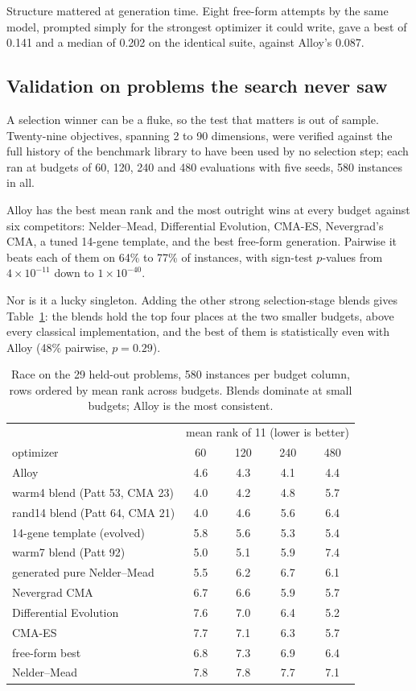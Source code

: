 \documentclass[11pt]{article}
\begin{document}
Structure mattered at generation time. Eight free-form attempts by the same
model, prompted simply for the strongest optimizer it could write, gave a
best of 0.141 and a median of 0.202 on the identical suite, against Alloy's
0.087.

\subsection{Validation on problems the search never saw}
\label{sec:heldout}

A selection winner can be a fluke, so the test that matters is out of
sample. Twenty-nine objectives, spanning 2 to 90 dimensions, were verified
against the full history of the benchmark library to have been used by no
selection step; each ran at budgets of 60, 120, 240 and 480 evaluations
with five seeds, 580 instances in all.

Alloy has the best mean rank and the most outright wins at every budget
against six competitors: Nelder--Mead, Differential Evolution, CMA-ES,
Nevergrad's CMA, a tuned 14-gene template, and the best free-form
generation. Pairwise it beats each of them on 64\% to 77\% of instances,
with sign-test $p$-values from $4\times10^{-11}$ down to
$1\times10^{-40}$.

Nor is it a lucky singleton. Adding the other strong selection-stage blends
gives Table~\ref{tab:untouched}: the blends hold the top four places at the
two smaller budgets, above every classical implementation, and the best of
them is statistically even with Alloy (48\% pairwise, $p = 0.29$).

\begin{table}[h]
\centering
\begin{tabular}{lcccc}
\toprule
 & \multicolumn{4}{c}{mean rank of 11 (lower is better)} \\
optimizer & 60 & 120 & 240 & 480 \\
\midrule
Alloy & 4.6 & 4.3 & 4.1 & 4.4 \\
warm4 blend (Patt 53, CMA 23) & 4.0 & 4.2 & 4.8 & 5.7 \\
rand14 blend (Patt 64, CMA 21) & 4.0 & 4.6 & 5.6 & 6.4 \\
14-gene template (evolved) & 5.8 & 5.6 & 5.3 & 5.4 \\
warm7 blend (Patt 92) & 5.0 & 5.1 & 5.9 & 7.4 \\
generated pure Nelder--Mead & 5.5 & 6.2 & 6.7 & 6.1 \\
Nevergrad CMA & 6.7 & 6.6 & 5.9 & 5.7 \\
Differential Evolution & 7.6 & 7.0 & 6.4 & 5.2 \\
CMA-ES & 7.7 & 7.1 & 6.3 & 5.7 \\
free-form best & 6.8 & 7.3 & 6.9 & 6.4 \\
Nelder--Mead & 7.8 & 7.8 & 7.7 & 7.1 \\
\bottomrule
\end{tabular}
\caption{Race on the 29 held-out problems, 580 instances per budget column,
rows ordered by mean rank across budgets. Blends dominate at small budgets;
Alloy is the most consistent.}
\label{tab:untouched}
\end{table}
\end{document}
